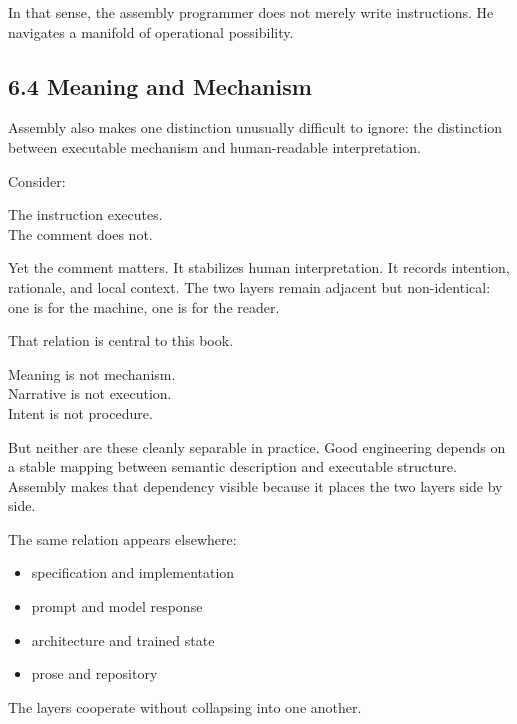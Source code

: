 In that sense, the assembly programmer does not merely write
instructions. He navigates a manifold of operational possibility.

\hypertarget{meaning-and-mechanism}{%
\subsection{6.4 Meaning and Mechanism}\label{meaning-and-mechanism}}

Assembly also makes one distinction unusually difficult to ignore: the
distinction between executable mechanism and human-readable
interpretation.

Consider:

\begin{Shaded}
\begin{Highlighting}[]
 
\end{Highlighting}
\end{Shaded}

The instruction executes.\\
The comment does not.

Yet the comment matters. It stabilizes human interpretation. It records
intention, rationale, and local context. The two layers remain adjacent
but non-identical: one is for the machine, one is for the reader.

That relation is central to this book.

Meaning is not mechanism.\\
Narrative is not execution.\\
Intent is not procedure.

But neither are these cleanly separable in practice. Good engineering
depends on a stable mapping between semantic description and executable
structure. Assembly makes that dependency visible because it places the
two layers side by side.

The same relation appears elsewhere:

\begin{itemize}
\tightlist
\item
  specification and implementation
\item
  prompt and model response
\item
  architecture and trained state
\item
  prose and repository
\end{itemize}

The layers cooperate without collapsing into one another.

